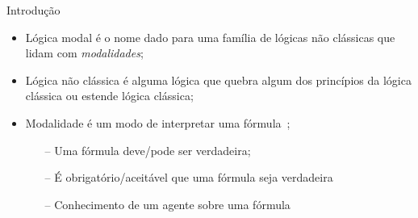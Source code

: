 \begin{frame}{Introdução}
    \begin{itemize}
        \item Lógica modal é o nome dado para uma família de lógicas não clássicas que lidam com \textit{modalidades};%
        \item Lógica não clássica é alguma lógica que quebra algum dos princípios da lógica clássica ou estende lógica clássica;
        \item Modalidade é um modo de interpretar uma fórmula~\cite{goldblatt1993mathematics};
        \begin{itemize}
            \item[--] Uma fórmula deve/pode ser verdadeira;
            \item[--] É obrigatório/aceitável que uma fórmula seja verdadeira
            \item[--] Conhecimento de um agente sobre uma fórmula
        \end{itemize}
    \end{itemize}
\end{frame}